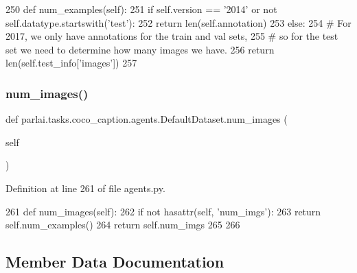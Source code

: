 \begin{DoxyCode}
250     \textcolor{keyword}{def }num\_examples(self):
251         \textcolor{keywordflow}{if} self.version == \textcolor{stringliteral}{'2014'} \textcolor{keywordflow}{or} \textcolor{keywordflow}{not} self.datatype.startswith(\textcolor{stringliteral}{'test'}):
252             \textcolor{keywordflow}{return} len(self.annotation)
253         \textcolor{keywordflow}{else}:
254             \textcolor{comment}{# For 2017, we only have annotations for the train and val sets,}
255             \textcolor{comment}{# so for the test set we need to determine how many images we have.}
256             \textcolor{keywordflow}{return} len(self.test\_info[\textcolor{stringliteral}{'images'}])
257 
\end{DoxyCode}
\mbox{\label{classparlai_1_1tasks_1_1coco__caption_1_1agents_1_1DefaultDataset_a72b989d5f9bf33fb573c89d9645e16ea}} 
\subsubsection{\texorpdfstring{num\+\_\+images()}{num\_images()}}
{\footnotesize\ttfamily def parlai.\+tasks.\+coco\+\_\+caption.\+agents.\+Default\+Dataset.\+num\+\_\+images (\begin{DoxyParamCaption}\item[{}]{self }\end{DoxyParamCaption})}



Definition at line 261 of file agents.\+py.


\begin{DoxyCode}
261     \textcolor{keyword}{def }num\_images(self):
262         \textcolor{keywordflow}{if} \textcolor{keywordflow}{not} hasattr(self, \textcolor{stringliteral}{'num\_imgs'}):
263             \textcolor{keywordflow}{return} self.num\_examples()
264         \textcolor{keywordflow}{return} self.num\_imgs
265 
266 
\end{DoxyCode}


\subsection{Member Data Documentation}
\mbox{\label{classparlai_1_1tasks_1_1coco__caption_1_1agents_1_1DefaultDataset_a6b5c2f828b4b8f8e625f691123338739}} 
